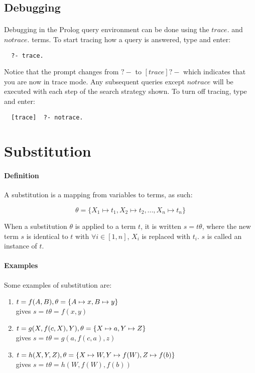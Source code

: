 \documentclass{article}
\begin{document}
\begin{multicols}{2}
  \subsection{Debugging}
  
  \paragraph{} Debugging in the Prolog query environment can be done using the $trace.$ and $notrace.$ terms. To start tracing how a query is answered, type and enter:
  
  \begin{lstlisting}
  ?- trace.
  \end{lstlisting}
  
  Notice that the prompt changes from $?-$ to $[trace]  ?-$ which indicates that you are now in trace mode. Any subsequent queries except $notrace$ will be executed with each step of the search strategy shown. To turn off tracing, type and enter:
  
  \begin{lstlisting}
  [trace]  ?- notrace.
  \end{lstlisting}
  
  \section{Substitution}
  
  \paragraph{Definition} A substitution is a mapping from variables to terms, as such:
  
  $$\theta = \{ X_1 \mapsto t_1, X_2 \mapsto t_2, ..., X_n \mapsto t_n \}$$
  
  When a substitution $\theta$ is applied to a term $t$, it is written $s = t\theta$, where the new term $s$ is identical to $t$ with $\forall i \in [1, n]$, $X_i$ is replaced with $t_i$. $s$ is called an instance of $t$.
  
  \paragraph{Examples} Some examples of substitution are:
  
  \begin{enumerate}
  \item $t = f(A,B),\\ \theta = \{A \mapsto x, B \mapsto y\}$\\ gives $s=t\theta=f(x, y)$
  \item $t = g(X, f(c, X), Y),\\ \theta = \{X \mapsto a, Y \mapsto Z\}$\\ gives $s=t\theta=g(a, f(c, a), z)$
  \item $t = h(X, Y, Z),\\ \theta = \{X \mapsto W, Y \mapsto f(W), Z \mapsto f(b)\}$\\ gives $s=t\theta=h(W, f(W), f(b))$
  \end{enumerate}
  

\end{multicols}
\end{document}
